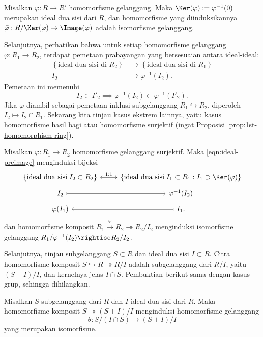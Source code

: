 \begin{proposition}\label{prop:1st-homomorphism-ring}
	Misalkan $\varphi: R \to R'$ homomorfisme gelanggang. Maka $\Ker(\varphi) := \varphi^{-1}(0)$ merupakan ideal dua sisi dari $R$, dan homomorfisme yang diinduksikannya $\bar{\varphi}: R/\Ker(\varphi) \to \Image(\varphi)$ adalah isomorfisme gelanggang.
\end{proposition}

Selanjutnya, perhatikan bahwa untuk setiap homomorfisme gelanggang $\varphi: R_1 \to R_2$, terdapat pemetaan prabayangan yang bersesuaian antara ideal-ideal:
\begin{equation}\label{eqn:ideal-preimage}\begin{aligned}
	\left\{ \text{ideal dua sisi di } R_2 \right\} & \longrightarrow \left\{ \text{ideal dua sisi di } R_1 \right\} \\
	I_2 & \longmapsto \varphi^{-1}(I_2).
\end{aligned}\end{equation}
Pemetaan ini memenuhi
\[ I_2 \subset I'_2 \implies \varphi^{-1}(I_2) \subset \varphi^{-1}(I'_2). \]
Jika $\varphi$ diambil sebagai pemetaan inklusi subgelanggang $R_1 \hookrightarrow R_2$, diperoleh $I_2 \mapsto I_2 \cap R_1$. Sekarang kita tinjau kasus ekstrem lainnya, yaitu kasus homomorfisme hasil bagi atau homomorfisme surjektif (ingat Proposisi \ref{prop:1st-homomorphism-ring}).

\begin{proposition}\label{prop:2nd-homomorphism-ring}
	Misalkan $\varphi: R_1 \to R_2$ homomorfisme gelanggang surjektif. Maka \eqref{eqn:ideal-preimage} menginduksi bijeksi
	\[ \begin{tikzcd}[row sep=tiny]
		\left\{ \text{ideal dua sisi}\;  I_2 \subset R_2  \right\} \arrow[leftrightarrow, r, "1:1"] & \left\{ \text{ideal dua sisi}\; I_1 \subset R_1 : I_1 \supset \Ker(\varphi)  \right\} \\
		I_2 \arrow[mapsto, r] & \varphi^{-1}(I_2) \\
		\varphi(I_1) & I_1 \arrow[mapsto, l].
	\end{tikzcd} \]
	dan homomorfisme komposit $R_1 \xrightarrow{\varphi} R_2 \twoheadrightarrow R_2/I_2$ menginduksi isomorfisme gelanggang $R_1/\varphi^{-1}(I_2) \rightiso R_2/I_2$.
\end{proposition}

Selanjutnya, tinjau subgelanggang $S \subset R$ dan ideal dua sisi $I \subset R$. Citra homomorfisme komposit $S \hookrightarrow R \twoheadrightarrow R/I$ adalah subgelanggang dari $R/I$, yaitu $(S+I)/I$, dan kernelnya jelas $I \cap S$. Pembuktian berikut sama dengan kasus grup, sehingga dihilangkan.
\begin{proposition}\label{prop:3rd-homomorphism-ring}
	Misalkan $S$ subgelanggang dari $R$ dan $I$ ideal dua sisi dari $R$. Maka homomorfisme komposit $S \twoheadrightarrow (S+I)/I$ menginduksi homomorfisme gelanggang
	\[ \theta: S/(I \cap S) \to (S+I)/I \]
	yang merupakan isomorfisme.
\end{proposition}

